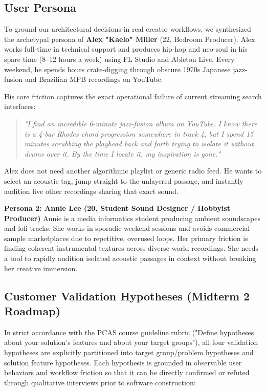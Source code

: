 \subsection*{User Persona}

To ground our architectural decisions in real creator workflows, we synthesized the archetypal persona of \textbf{Alex "Kaelo" Miller} (22, Bedroom Producer). Alex works full-time in technical support and produces hip-hop and neo-soul in his spare time (8--12 hours a week) using FL Studio and Ableton Live. Every weekend, he spends hours crate-digging through obscure 1970s Japanese jazz-fusion and Brazilian MPB recordings on YouTube.

His core friction captures the exact operational failure of current streaming search interfaces:
\begin{quote}
\textit{"I find an incredible 6-minute jazz-fusion album on YouTube. I know there is a 4-bar Rhodes chord progression somewhere in track 4, but I spend 15 minutes scrubbing the playhead back and forth trying to isolate it without drums over it. By the time I locate it, my inspiration is gone."}
\end{quote}
Alex does not need another algorithmic playlist or generic radio feed. He wants to select an acoustic tag, jump straight to the unlayered passage, and instantly audition five other recordings sharing that exact sound.

\vspace{0.5em}
\noindent\textbf{Persona 2: Annie Lee (20, Student Sound Designer / Hobbyist Producer)} \newline
Annie is a media informatics student producing ambient soundscapes and lofi tracks. She works in sporadic weekend sessions and avoids commercial sample marketplaces due to repetitive, overused loops. Her primary friction is finding coherent instrumental textures across diverse world recordings. She needs a tool to rapidly audition isolated acoustic passages in context without breaking her creative immersion.

\subsection*{Customer Validation Hypotheses (Midterm 2 Roadmap)}

In strict accordance with the PCAS course guideline rubric ("Define hypotheses about your solution's features and about your target groups"), all four validation hypotheses are explicitly partitioned into target group/problem hypotheses and solution feature hypotheses. Each hypothesis is grounded in observable user behaviors and workflow friction so that it can be directly confirmed or refuted through qualitative interviews prior to software construction:

